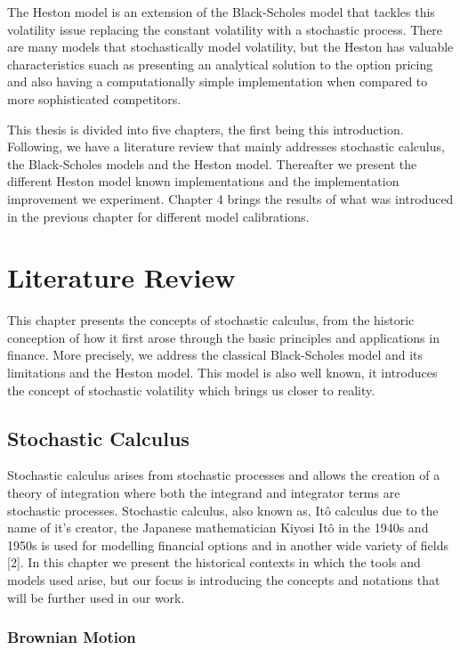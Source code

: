 \documentclass[12pt,twoside]{reedthesis}
\theoremstyle{definition}
\theoremstyle{definition}
\theoremstyle{remark}
\begin{document}
  The Heston model is an extension of the Black-Scholes model that tackles
  this volatility issue replacing the constant volatility with a
  stochastic process. There are many models that stochastically model
  volatility, but the Heston has valuable characteristics suach as
  presenting an analytical solution to the option pricing and also having
  a computationally simple implementation when compared to more
  sophisticated competitors.
  
  This thesis is divided into five chapters, the first being this
  introduction. Following, we have a literature review that mainly
  addresses stochastic calculus, the Black-Scholes models and the Heston
  model. Thereafter we present the different Heston model known
  implementations and the implementation improvement we experiment.
  Chapter 4 brings the results of what was introduced in the previous
  chapter for different model calibrations.
  
  \chapter{Literature Review}\label{lt-review}
  
  This chapter presents the concepts of stochastic calculus, from the
  historic conception of how it first arose through the basic principles
  and applications in finance. More precisely, we address the classical
  Black-Scholes model and its limitations and the Heston model. This model
  is also well known, it introduces the concept of stochastic volatility
  which brings us closer to reality.
  
  \section{Stochastic Calculus}\label{stochastic-calculus}
  
  Stochastic calculus arises from stochastic processes and allows the
  creation of a theory of integration where both the integrand and
  integrator terms are stochastic processes. Stochastic calculus, also
  known as, Itô calculus due to the name of it's creator, the Japanese
  mathematician Kiyosi Itô in the 1940s and 1950s is used for modelling
  financial options and in another wide variety of fields {[}2{]}. In this
  chapter we present the historical contexts in which the tools and models
  used arise, but our focus is introducing the concepts and notations that
  will be further used in our work.
  
  \subsection{Brownian Motion}\label{brownian-motion}
  
\end{document}
